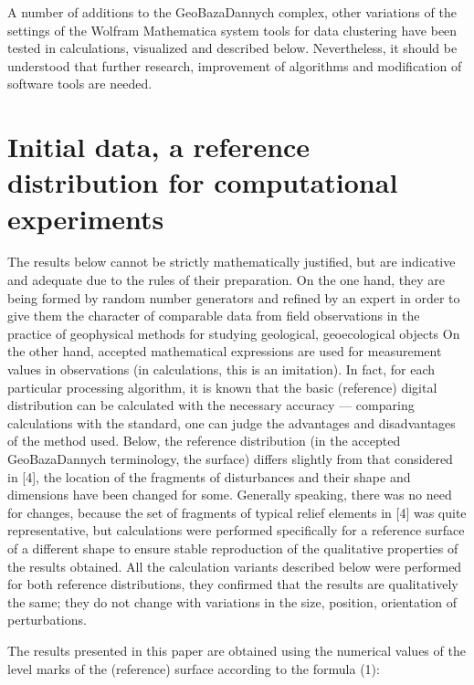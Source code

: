\documentclass[8pt, a4paper]{article} %
\begin{document}
\begin{multicols}{2}
\fontsize{10}{14}
\selectfont 
\quad
A number of additions to the GeoBazaDannych complex, other variations of the settings of the Wolfram
Mathematica system tools for data clustering have been
tested in calculations, visualized and described below. Nevertheless, it should be understood that further research, improvement of algorithms and modification of software tools are needed.

\fontsize{10}{15}
\selectfont
 \section{\textbf{Initial data, a reference distribution for computational experiments}}

 
\fontsize{10}{14}
\selectfont 
\quad
The results below cannot be strictly mathematically
justified, but are indicative and adequate due to the rules of their preparation. On the one hand, they are being formed by random number generators and refined by an expert in order to give them the character of comparable data from field observations in the practice of geophysical methods for studying geological, geoecological objects On the other hand, accepted mathematical expressions are used for measurement values in observations (in calculations, this is an imitation). In fact, for each particular processing algorithm, it is known that the basic
(reference) digital distribution can be calculated with the necessary accuracy — comparing calculations with the standard, one can judge the advantages and disadvantages of the method used. Below, the reference distribution (in the accepted GeoBazaDannych terminology, the surface)
differs slightly from that considered in [4], the location of the fragments of disturbances and their shape and dimensions have been changed for some. Generally speaking, there was no need for changes, because the set of fragments of typical relief elements in [4] was quite representative, but calculations were performed specifically for a reference surface of a different shape to ensure stable reproduction of the qualitative properties of the results obtained. All the calculation variants described below were performed for both reference distributions, they confirmed that the results are qualitatively the same; they do not change with variations in the size, position, orientation of perturbations.


\fontsize{10}{14}
\selectfont 
\quad
The results presented in this paper are obtained using
the numerical values of the level marks of the (reference)
surface according to the formula (1):



\end{multicols}
\end{document}
